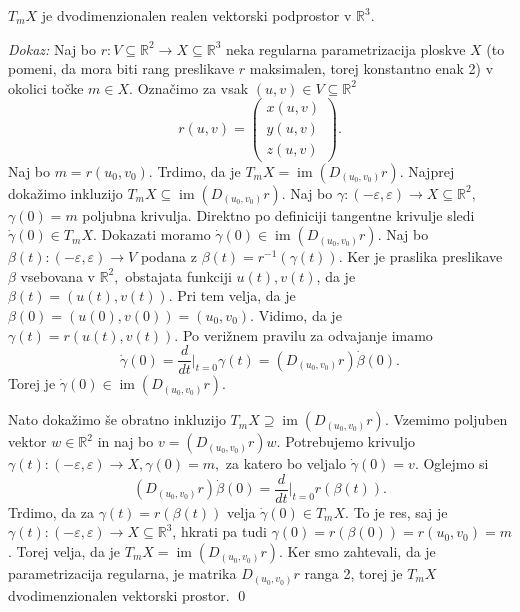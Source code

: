 \begin{trditev}
\label{trd_tangentna_ravnina_je_dvodimenzionalen_vektorski_prostor}
$T_mX$ je dvodimenzionalen realen vektorski podprostor v
$\mathbb{R}^3$. 
\end{trditev} 
{\em Dokaz:\/} Naj bo $r : V
\subseteq  \mathbb{R}^2 \to X \subseteq \mathbb{R}^3$ neka regularna
parametrizacija ploskve $X$ (to pomeni, da mora biti rang preslikave
$r$ maksimalen, torej konstantno enak 2) v okolici točke  $m \in  X$.  Označimo za vsak $\left( u, v \right) \in  V \subseteq \mathbb{R}^2$ \begin{equation*} r\left( u,v \right) = 
\begin{pmatrix} x\left( u,v
\right) \\ y\left( u,v \right) \\ z\left( u,v \right)
\end{pmatrix} . \end{equation*}
Naj bo $m = r\left( u_0, v_0 \right).$ Trdimo, da
je $ T_mX = \operatorname{im} \left( D_{(u_0, v_0)}r \right) $.
Najprej dokažimo inkluzijo $T_mX \subseteq \operatorname{im} \left(
D_{(u_0, v_0)}r \right)$. 
Naj bo $\gamma: \left( -\varepsilon,
\varepsilon \right) \to X \subseteq \mathbb{R}^2,$ $\gamma \left( 0
\right) = m$ poljubna krivulja. Direktno
po definiciji tangentne krivulje sledi $\dot{\gamma}\left( 0 \right)
\in T_mX$. 
Dokazati moramo $\dot{\gamma}(0) \in \operatorname{im} \left(D_{\left( u_0, v_0 \right)} r \right)$. Naj bo
$\beta \left( t \right) : \left( -\varepsilon, \varepsilon \right)\to
V$ podana z $\beta\left( t \right) = r^{-1}\left( \gamma\left( t
\right) \right)$. Ker je praslika preslikave $\beta$ vsebovana v
$\mathbb{R}^2,$ obstajata funkciji $u\left( t \right), v\left( t
\right)$, da je $\beta\left( t \right) = \left( u(t), v(t) \right).$
Pri tem velja, da je $\beta(0) = (u(0), v(0)) = (u_0, v_0).$ Vidimo,
da je $\gamma(t) = r(u(t), v(t)).$ Po verižnem pravilu za odvajanje
imamo \begin{equation*} \dot{\gamma }(0)= \frac{d}{dt} \big|_{t = 0} \gamma(t) =
\left( D_{ (u_0, v_0)}r \right) \dot{\beta} (0).\end{equation*}Torej je
$\dot{\gamma} (0) \in \operatorname{im} \left( D_{(u_0,v_0)}r
\right).$ 

Nato dokažimo še obratno inkluzijo $T_mX \supseteq
\operatorname{im} \left( D_{(u_0, v_0)}r \right)$. Vzemimo poljuben
vektor $w \in \mathbb{R}^2$ in naj bo $v = \left( D_{(u_0, v_0)} r \right) w$. Potrebujemo krivuljo $\gamma(t) : (-\varepsilon, \varepsilon) \to  X,
\gamma(0) = m,$ za katero bo veljalo $\dot{\gamma} (0) = v.$
Oglejmo si \begin{equation*} \left( D_{(u_0, v_0)}r \right)\dot{\beta} (0) =
\frac{d}{dt} \big|_{t = 0} r(\beta(t)). \end{equation*}  Trdimo, da za $\gamma(t) =
r(\beta(t))$  velja $\dot{\gamma}(0) \in  T_mX.$ To
je res, saj je $\gamma(t): (-\varepsilon,
\varepsilon)\to  X \subseteq \mathbb{R}^3$, hkrati pa tudi $\gamma(0) = r(\beta(0) )= r(u_0, v_0) = m$. Torej velja,
da je $T_mX = \operatorname{im}(D_{(u_0,v_0)}r)$. Ker smo zahtevali,
da je parametrizacija regularna, je matrika $D_{(u_0,v_0)}r$ ranga 2,
torej je  $T_mX$ dvodimenzionalen vektorski prostor.
\qed

